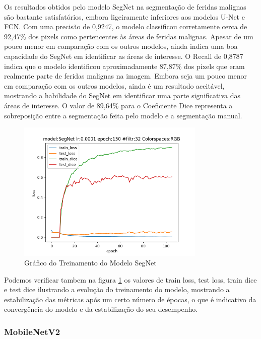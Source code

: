         Os resultados obtidos pelo modelo \ac{SegNet} na segmentação de feridas malignas são bastante satisfatórios, embora ligeiramente inferiores aos modelos \ac{U-Net} e \ac{FCN}. Com uma precisão de 0,9247, o modelo classificou corretamente cerca de 92,47\% dos pixels como pertencentes às áreas de feridas malignas. Apesar de um pouco menor em comparação com os outros modelos, ainda indica uma boa capacidade do \ac{SegNet} em identificar as áreas de interesse. O Recall de 0,8787 indica que o modelo identificou aproximadamente 87,87\% dos pixels que eram realmente parte de feridas malignas na imagem. Embora seja um pouco menor em comparação com os outros modelos, ainda é um resultado aceitável, mostrando a habilidade do \ac{SegNet} em identificar uma parte significativa das áreas de interesse. O valor de 89,64\% para o Coeficiente Dice representa a sobreposição entre a segmentação feita pelo modelo e a segmentação manual.
        
          \begin{figure}[H]
            \centering
            \includegraphics[width=0.8\textwidth]{img/segnetprunedmodelfile.png}
            \caption{ Gráfico do Treinamento do Modelo \acf{SegNet} }
            \label{fig:graphSegNet}
          \end{figure}

        Podemos verificar tambem na figura \ref{fig:graphSegNet} os valores de train loss, test loss, train dice e test dice ilustrando a evolução do treinamento do modelo, mostrando a estabilização das métricas após um certo número de épocas, o que é indicativo da convergência do modelo e da estabilização do seu desempenho.

          
    \subsubsection{MobileNetV2}

